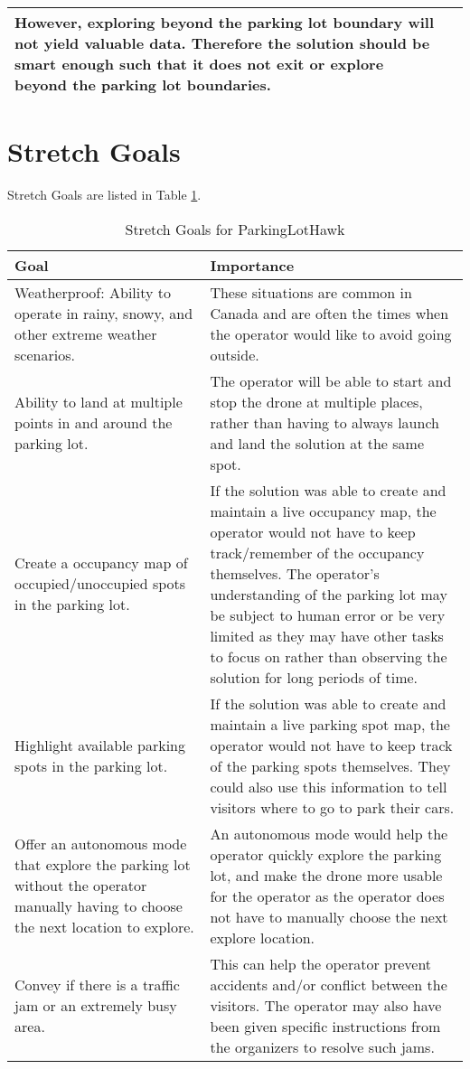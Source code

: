 \documentclass{article}
\begin{document}
\begin{table}
\begin{tabular}{ | m{5cm} | m{7cm} | }
However, exploring beyond the parking lot boundary will not yield valuable data. Therefore the solution should be smart enough such that it does not exit or explore beyond the parking lot boundaries.
 \\ 
  \hline
  
\end{tabular}
\end{table}%

\clearpage


\section{Stretch Goals}
Stretch Goals are listed in Table \ref{table:Stretch}.
\begin{table}[!h]
\centering
\caption {Stretch Goals for ParkingLotHawk} 
\label{table:Stretch}
\begin{tabular}{ | m{5cm} | m{7cm} | } 
  \hline
  Goal & Importance \\ 
  \hline
  Weatherproof: Ability to operate in rainy, snowy, and other extreme weather scenarios.
& These situations are common in Canada and are often the times when the operator would like to avoid going outside.

  \\ 
  \hline
  Ability to land at multiple points in and around the parking lot.
 & The operator will be able to start and stop the drone at multiple places, rather than having to always launch and land the solution at the same spot.
 
 \\ 
   \hline
  Create a occupancy map of occupied/unoccupied spots in the parking lot. 
 & If the solution was able to create and maintain a live occupancy map, the operator would not have to keep track/remember of the occupancy themselves. The operator's understanding of the parking lot may be subject to human error or be very limited as they may have other tasks to focus on rather than observing the solution for long periods of time. 
 \\ 
  \hline
  Highlight available parking spots in the parking lot. 
 & If the solution was able to create and maintain a live parking spot map, the operator would not have to keep track of the parking spots themselves. They could also use this information to tell visitors where to go to park their cars. 
 \\ 
  \hline
  Offer an autonomous mode that explore the parking lot without the operator manually having to choose the next location to explore. & An autonomous mode would help the operator quickly explore the parking lot, and make the drone more usable for the operator as the operator does not have to manually choose the next explore location.
  \\ 
  \hline
  Convey if there is a traffic jam or an extremely busy area.
 & This can help the operator prevent accidents and/or conflict between the visitors. The operator may also have been given specific instructions from the organizers to resolve such jams.
 \\ 
  
 
  \hline
\end{tabular}
\end{table}%
\end{document}
